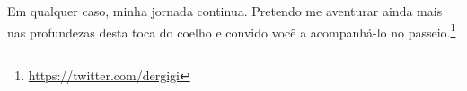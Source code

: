 Em qualquer caso, minha jornada continua. Pretendo me aventurar ainda mais nas profundezas desta toca do coelho e convido você a acompanhá-lo no passeio.\footnote{\url{https://twitter.com/dergigi}}

%

